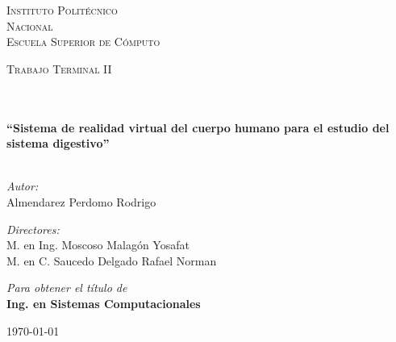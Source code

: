 \begin{center}
\begin{minipage}{0.48\textwidth}
\begin{flushright}
\end{flushright}\end{minipage}
\vspace*{1.5cm}
\textsc{\huge Instituto Polit\'ecnico\\ \vspace{5px} Nacional}\\[1.5cm]
\textsc{\LARGE Escuela Superior de C\'omputo}\\[1.5cm]
\begin{minipage}{0.9\textwidth} 
\begin{center}
\textsc{\LARGE Trabajo Terminal II}
\end{center}
\end{minipage}\\[0.5cm]
\vspace*{1cm}
\HRule \\[0.4cm]
{ \huge \bfseries “Sistema de realidad virtual del cuerpo humano para el estudio del sistema digestivo”
}\\[0.4cm]
\HRule \\[1.5cm]
\begin{minipage}{0.46\textwidth}
\begin{flushleft} \large
\emph{Autor:}\\	
Almendarez Perdomo Rodrigo\\
\end{flushleft}
\end{minipage}
\begin{minipage}{0.52\textwidth}		
\vspace{-0.6cm}
\begin{flushright} \large
\emph{Directores:} \\
M. en Ing. Moscoso Malagón Yosafat\\
M. en C. Saucedo Delgado Rafael Norman
\end{flushright}
\end{minipage}
\vspace*{1cm}
\vspace{1cm}	
\emph{Para obtener el título de }\\
\vspace{1cm}	
{\textbf{\Large Ing. en Sistemas Computacionales}}\\
\vspace{1cm}
\begin{center}
{\large \today}
\end{center}
\end{center}
